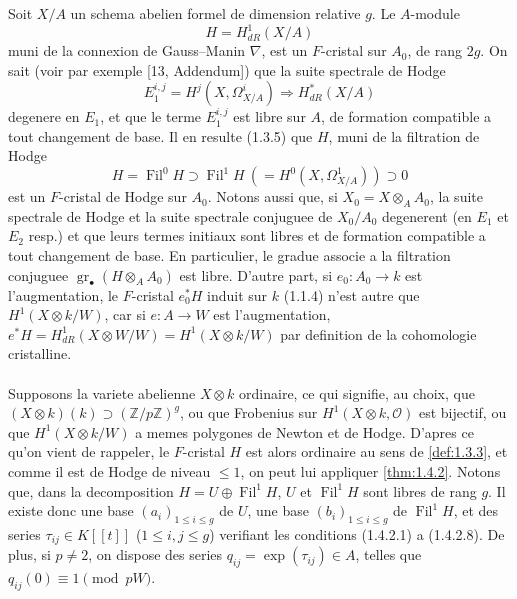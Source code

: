 \documentclass[12pt,a4paper]{article}
\theoremstyle{plain}
\theoremstyle{definition}
\theoremstyle{remark}
\DeclareMathOperator{\gr}{gr}
\DeclareMathOperator{\Fil}{Fil}
\begin{document}
Soit $X/A$ un schema abelien formel de dimension relative $g$. Le $A$-module
\[
H = H_{dR}^1(X/A)
\]
muni de la connexion de Gauss--Manin $\nabla$, est un $F$-cristal sur $A_0$, de rang $2g$. On sait (voir par exemple [13, Addendum]) que la suite spectrale de Hodge
\[
E_1^{i,j} = H^j(X, \Omega_{X/A}^i) \Longrightarrow H_{dR}^*(X/A)
\]
degenere en $E_1$, et que le terme $E_1^{i,j}$ est libre sur $A$, de formation compatible a tout changement de base. Il en resulte (1.3.5) que $H$, muni de la filtration de Hodge
\[
H = \Fil^0H \supset \Fil^1H\ (= H^0(X, \Omega_{X/A}^1)) \supset 0
\]
est un $F$-cristal de Hodge sur $A_0$. Notons aussi que, si $X_0 = X \otimes_A A_0$, la suite spectrale de Hodge et la suite spectrale conjuguee de $X_0/A_0$ degenerent (en $E_1$ et $E_2$ resp.) et que leurs termes initiaux sont libres et de formation compatible a tout changement de base. En particulier, le gradue associe a la filtration conjuguee $\gr_\bullet(H \otimes_A A_0)$ est libre. D'autre part, si $e_0 : A_0 \to k$ est l'augmentation, le $F$-cristal $e_0^*H$ induit sur $k$ (1.1.4) n'est autre que $H^1(X \otimes k/W)$, car si $e : A \to W$ est l'augmentation, $e^*H = H_{dR}^1(X \otimes W/W) = H^1(X \otimes k/W)$ par definition de la cohomologie cristalline.

\paragraph{}

Supposons la variete abelienne $X \otimes k$ ordinaire, ce qui signifie, au choix, que $(X \otimes k)(k) \supset (\mathbb{Z}/p\mathbb{Z})^g$, ou que Frobenius sur $H^1(X \otimes k, \mathcal{O})$ est bijectif, ou que $H^1(X \otimes k/W)$ a memes polygones de Newton et de Hodge. D'apres ce qu'on vient de rappeler, le $F$-cristal $H$ est alors ordinaire au sens de \ref{def:1.3.3}, et comme il est de Hodge de niveau $\leq 1$, on peut lui appliquer \ref{thm:1.4.2}. Notons que, dans la decomposition $H = U \oplus \Fil^1H$, $U$ et $\Fil^1H$ sont libres de rang $g$. Il existe donc une base $(a_i)_{1 \leq i \leq g}$ de $U$, une base $(b_i)_{1 \leq i \leq g}$ de $\Fil^1H$, et des series $\tau_{ij} \in K[[t]]$ ($1 \leq i,j \leq g$) verifiant les conditions (1.4.2.1) a (1.4.2.8). De plus, si $p \neq 2$, on dispose des series $q_{ij} = \exp(\tau_{ij}) \in A$, telles que $q_{ij}(0) \equiv 1 \pmod{pW}$.

\paragraph{}
\end{document}
